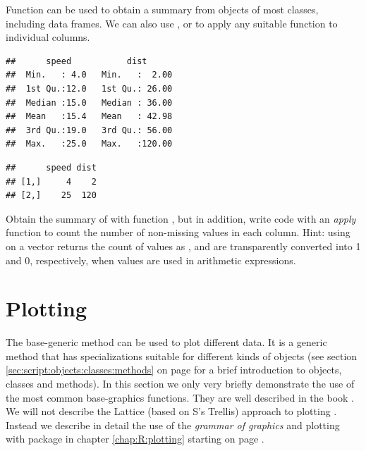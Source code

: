 \documentclass[krantz2]{krantz}\usepackage{knitr}
\begin{document}
Function  can be used to obtain a summary from objects of most \Rlang classes, including data frames. We can also use ,  or  to apply any suitable function to individual columns.

\begin{knitrout}\footnotesize
{}\color{fgcolor}\begin{kframe}
\begin{alltt}
\end{alltt}
\begin{verbatim}
##      speed           dist       
##  Min.   : 4.0   Min.   :  2.00  
##  1st Qu.:12.0   1st Qu.: 26.00  
##  Median :15.0   Median : 36.00  
##  Mean   :15.4   Mean   : 42.98  
##  3rd Qu.:19.0   3rd Qu.: 56.00  
##  Max.   :25.0   Max.   :120.00
\end{verbatim}
\begin{alltt}
\end{alltt}
\begin{verbatim}
##      speed dist
## [1,]     4    2
## [2,]    25  120
\end{verbatim}
\end{kframe}
\end{knitrout}

\begin{advplayground}
Obtain the summary of  with function , but in addition, write code with an \emph{apply} function to count the number of non-missing values in each column. Hint: using  on a  vector returns the count of  values as , and  are transparently converted into  1 and 0, respectively, when  values are used in arithmetic expressions.
\end{advplayground}

\section{Plotting}
The base-\Rlang generic method  can be used to plot different data. It is a generic method that has specializations suitable for different kinds of objects (see section \ref{sec:script:objects:classes:methods} on page \pageref{sec:script:objects:classes:methods} for a brief introduction to objects, classes and methods). In this section we only very briefly demonstrate the use of the most common base-\Rlang graphics functions. They are well described in the book  \autocite{Murrell2019}. We will not describe the Lattice (based on S's Trellis) approach to plotting \autocite{Sarkar2008}. Instead we describe in detail the use of the \emph{grammar of graphics} and plotting with package \ggplot in chapter \ref{chap:R:plotting} starting on page \pageref{chap:R:plotting}.
\end{document}
